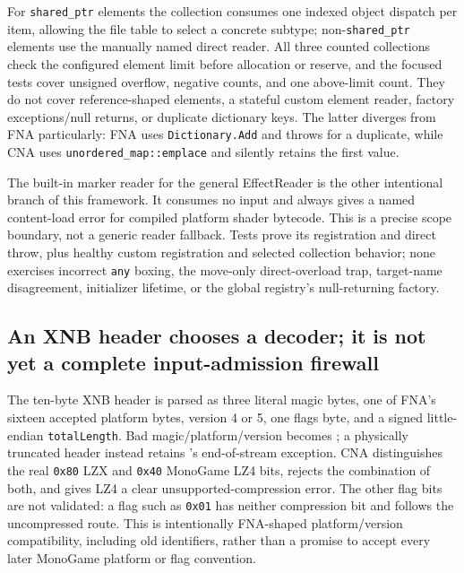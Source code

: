 For \texttt{shared\_ptr} elements the collection consumes one indexed object dispatch per item,
allowing the file table to select a concrete subtype; non-\texttt{shared\_ptr} elements use the
manually named direct reader. All three counted collections check the configured element limit
before allocation or reserve, and the focused tests cover unsigned overflow, negative counts, and
one above-limit count. They do not cover reference-shaped elements, a stateful custom element
reader, factory exceptions/null returns, or duplicate dictionary keys. The latter diverges from
FNA particularly: FNA uses \texttt{Dictionary.Add} and throws for a duplicate, while CNA uses
\texttt{unordered\_map::emplace} and silently retains the first value.

The built-in marker reader for the general EffectReader is the other intentional branch of this
framework. It consumes no input and always gives a named content-load error for compiled platform
shader bytecode. This is a precise scope boundary, not a generic reader fallback. Tests prove its
registration and direct throw, plus healthy custom registration and selected collection behavior;
none exercises incorrect \texttt{any} boxing, the move-only direct-overload trap, target-name
disagreement, initializer lifetime, or the global registry's null-returning factory.

\subsection{An XNB header chooses a decoder; it is not yet a complete input-admission firewall}
\label{sec:xnb-container-boundary}

The ten-byte XNB header is parsed as three literal magic bytes, one of FNA's sixteen accepted
platform bytes, version 4 or 5, one flags byte, and a signed little-endian \texttt{totalLength}.
Bad magic/platform/version becomes ; a physically truncated header
instead retains 's end-of-stream exception. CNA distinguishes the real
\texttt{0x80} LZX and \texttt{0x40} MonoGame LZ4 bits, rejects the combination of both, and gives
LZ4 a clear unsupported-compression error. The other flag bits are not validated: a flag such as
\texttt{0x01} has neither compression bit and follows the uncompressed route. This is intentionally
FNA-shaped platform/version compatibility, including old identifiers, rather than a promise to
accept every later MonoGame platform or flag convention.

